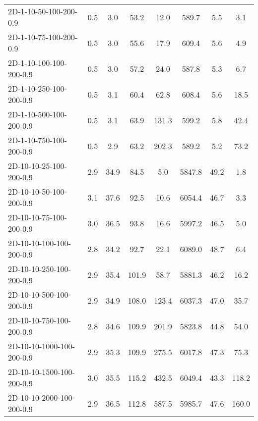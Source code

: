 \documentclass{article}
\begin{document}
\begin{table}[h]
\begin{center}
\begin{tabular}{|l||c|c|c|c|c|c|c|}
            2D-1-10-50-100-200-0.9         & 0.5  & 3.0       & 53.2       & 12.0        & 589.7    & 5.5       & 3.1        \\
            2D-1-10-75-100-200-0.9         & 0.5  & 3.0       & 55.6       & 17.9        & 609.4    & 5.6       & 4.9        \\
            2D-1-10-100-100-200-0.9        & 0.5  & 3.0       & 57.2       & 24.0        & 587.8    & 5.3       & 6.7        \\
            2D-1-10-250-100-200-0.9        & 0.5  & 3.1       & 60.4       & 62.8        & 608.4    & 5.6       & 18.5       \\
            2D-1-10-500-100-200-0.9        & 0.5  & 3.1       & 63.9       & 131.3       & 599.2    & 5.8       & 42.4       \\
            2D-1-10-750-100-200-0.9        & 0.5  & 2.9       & 63.2       & 202.3       & 589.2    & 5.2       & 73.2       \\
            \hline
            2D-10-10-25-100-200-0.9        & 2.9  & 34.9      & 84.5       & 5.0         & 5847.8   & 49.2      & 1.8        \\
            2D-10-10-50-100-200-0.9        & 3.1  & 37.6      & 92.5       & 10.6        & 6054.4   & 46.7      & 3.3        \\
            2D-10-10-75-100-200-0.9        & 3.0  & 36.5      & 93.8       & 16.6        & 5997.2   & 46.5      & 5.0        \\
            2D-10-10-100-100-200-0.9       & 2.8  & 34.2      & 92.7       & 22.1        & 6089.0   & 48.7      & 6.4        \\
            2D-10-10-250-100-200-0.9       & 2.9  & 35.4      & 101.9      & 58.7        & 5881.3   & 46.2      & 16.2       \\
            2D-10-10-500-100-200-0.9       & 2.9  & 34.9      & 108.0      & 123.4       & 6037.3   & 47.0      & 35.7       \\
            2D-10-10-750-100-200-0.9       & 2.8  & 34.6      & 109.9      & 201.9       & 5823.8   & 44.8      & 54.0       \\
            2D-10-10-1000-100-200-0.9      & 2.9  & 35.3      & 109.9      & 275.5       & 6017.8   & 47.3      & 75.3       \\
            2D-10-10-1500-100-200-0.9      & 3.0  & 35.5      & 115.2      & 432.5       & 6049.4   & 43.3      & 118.2      \\
            2D-10-10-2000-100-200-0.9      & 2.9  & 36.5      & 112.8      & 587.5       & 5985.7   & 47.6      & 160.0      \\

\end{tabular}
\end{center}
\end{table}
\end{document}
